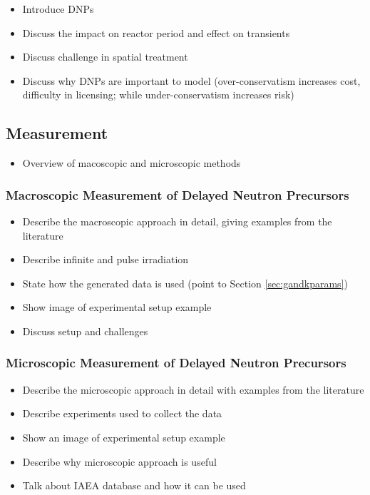 \begin{itemize}
    \item Introduce \glspl{DNP}
    \item Discuss the impact on reactor period and effect on transients
    \item Discuss challenge in spatial treatment
    \item Discuss why \glspl{DNP} are important to model (over-conservatism increases cost, difficulty in licensing; while under-conservatism increases risk)
\end{itemize}

\subsection{Measurement}
\label{sec:measurementofdnps}

\begin{itemize}
    \item Overview of macoscopic and microscopic methods
\end{itemize}

\subsubsection{Macroscopic Measurement of Delayed Neutron Precursors}

\begin{itemize}
    \item Describe the macroscopic approach in detail, giving examples from the literature
    \item Describe infinite and pulse irradiation
    \item State how the generated data is used (point to Section \ref{sec:gandkparams})
    \item Show image of experimental setup example
    \item Discuss setup and challenges
\end{itemize}

\subsubsection{Microscopic Measurement of Delayed Neutron Precursors}

\begin{itemize}
    \item Describe the microscopic approach in detail with examples from the literature
    \item Describe experiments used to collect the data
    \item Show an image of experimental setup example
    \item Describe why microscopic approach is useful
    \item Talk about \gls{IAEA} database and how it can be used
\end{itemize}